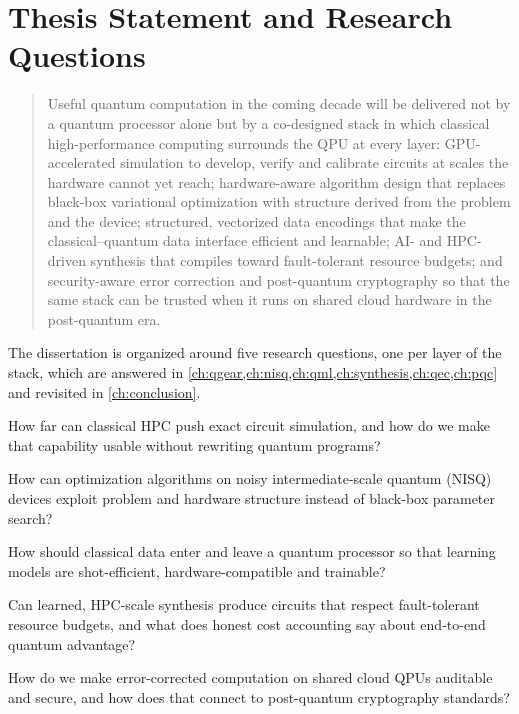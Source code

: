 \section{Thesis Statement and Research Questions}\label{sec:intro:thesis}

\begin{quote}
Useful quantum computation in the coming decade will be delivered not by a quantum processor alone but by a co-designed stack in which classical high-performance computing surrounds the QPU at every layer: GPU-accelerated simulation to develop, verify and calibrate circuits at scales the hardware cannot yet reach; hardware-aware algorithm design that replaces black-box variational optimization with structure derived from the problem and the device; structured, vectorized data encodings that make the classical--quantum data interface efficient and learnable; AI- and HPC-driven synthesis that compiles toward fault-tolerant resource budgets; and security-aware error correction and post-quantum cryptography so that the same stack can be trusted when it runs on shared cloud hardware in the post-quantum era.
\end{quote}

The dissertation is organized around five research questions, one per layer of the stack, which are answered in \cref{ch:qgear,ch:nisq,ch:qml,ch:synthesis,ch:qec,ch:pqc} and revisited in \cref{ch:conclusion}.

\begin{description}[style=nextline,leftmargin=1.5em]
\item[RQ1 (Scale).] How far can classical HPC push exact circuit simulation, and how do we make that capability usable without rewriting quantum programs?
\item[RQ2 (Noise).] How can optimization algorithms on noisy intermediate-scale quantum (NISQ) devices exploit problem and hardware structure instead of black-box parameter search?
\item[RQ3 (Data).] How should classical data enter and leave a quantum processor so that learning models are shot-efficient, hardware-compatible and trainable?
\item[RQ4 (Synthesis).] Can learned, HPC-scale synthesis produce circuits that respect fault-tolerant resource budgets, and what does honest cost accounting say about end-to-end quantum advantage?
\item[RQ5 (Trust).] How do we make error-corrected computation on shared cloud QPUs auditable and secure, and how does that connect to post-quantum cryptography standards?
\end{description}

